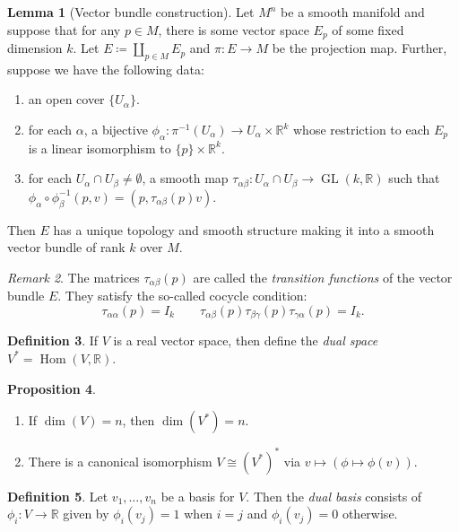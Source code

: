 \documentclass[10pt,letterpaper,cm]{nupset}
\theoremstyle{definition}
\newtheorem{definition}{Definition}[subsection]
\theoremstyle{theorem}
\newtheorem{lemma}[definition]{Lemma}
\newtheorem{prop}[definition]{Proposition}
\theoremstyle{remark}
\newtheorem{remark}[definition]{Remark}
\newcommand{\R}{\mathbb R}
\newcommand{\1}{\mathbf{1}}
\newcommand{\0}{\vec 0}
\DeclareMathOperator{\GL}{GL}
\DeclareMathOperator{\Hom}{Hom}
\begin{document}
\begin{lemma}[Vector bundle construction]
Let $M^n$ be a smooth manifold and suppose that for any $p\in M$, there is some vector space $E_p$ of some fixed dimension $k$. Let $E\coloneqq  \coprod_{p\in M} E_p$ and $\pi : E \to M$ be the projection map. Further, suppose we have the following data:
\begin{enumerate}
\item an open cover $\{U_{\alpha}\}$.
\item for each $\alpha$, a bijective $\phi_{\alpha} : \pi^{-1}(U_{\alpha}) \to U_{\alpha} \times \R^k$ whose restriction to each $E_p$ is a linear isomorphism to $\{p\}\times \R^k$.
\item for each $U_{\alpha} \cap U_{\beta} \ne \emptyset$, a smooth map $\tau_{\alpha \beta} : U_{\alpha} \cap U_{\beta} \to \GL(k , \R)$ such that $\phi_{\alpha} \circ \phi_{\beta}^{-1}(p, v) = (p, \tau_{\alpha \beta}(p)v)$.
\end{enumerate}
Then $E$ has a unique topology and smooth structure making it into a smooth vector bundle of rank $k$ over $M$.
\end{lemma}

\begin{remark}
The matrices $\tau_{\alpha \beta}(p)$ are called the \textit{transition functions} of the vector bundle $E$. They satisfy the so-called cocycle condition: 
\[ \tau_{\alpha \alpha}(p) = I_k \quad \quad \tau_{\alpha \beta}(p)\tau_{\beta \gamma}(p)\tau_{\gamma \alpha}(p) = I_k.\]
\end{remark}

\begin{definition}
If $V$ is a real vector space, then define the \textit{dual space} $V^{\ast} = \Hom(V, \R)$.
\end{definition}
\begin{prop} $ $ 
\begin{enumerate}
\item If $\dim(V) =n$, then $\dim(V^{\ast}) = n$.
\item There is a canonical isomorphism $V \cong (V^{\ast})^{\ast}$ via $v \mapsto (\phi \mapsto \phi(v))$.
\end{enumerate}
\end{prop}
\begin{definition}
Let $v_1, \ldots, v_n$ be a basis for $V$. Then the \textit{dual basis} consists of $\phi_i : V \to \R$ given by $\phi_i(v_j) = 1$ when $i = j$ and $\phi_i(v_j)= 0$ otherwise.
\end{definition}
\end{document}
